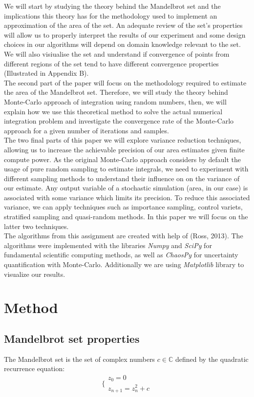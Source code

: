 \documentclass{article}
\begin{document}
    We will start by studying the theory behind the Mandelbrot set and the implications this theory has for the methodology used to implement an approximation of the area of the set. An adequate review of the set's properties will allow us to properly interpret the results of our experiment and some design choices in our algorithms will depend on domain knowledge relevant to the set. We will also visiualise the set and understand if convergence of points from different regions of the set tend to have different convergence properties (Illustrated in Appendix B).\\
    The second part of the paper will focus on the methodology required to estimate the area of the Mandelbrot set. Therefore, we will study the theory behind Monte-Carlo approach of integration using random numbers, then, we will explain how we use this theoretical method to solve the actual numerical integration problem and investigate the convergence rate of the Monte-Carlo approach for a given number of iterations and samples.\\
    The two final  parts of this paper we will explore variance reduction techniques, allowing us to increase the achievable precision of our area estimates given finite compute power. As the original Monte-Carlo approach considers by default the usage of pure random sampling to estimate integrals, we need to experiment with different sampling methods to understand their influence on on the variance of our estimate. Any output variable of a stochastic simulation (area, in our case) is associated with some variance which limits its precision. To reduce this associated variance, we can apply techniques such as importance sampling, control variets, stratified sampling and quasi-random methods. In this paper we will focus on the latter two techniques. \\
    The algorithms from this assignment are created with help of (Ross, 2013). The algorithms were implemented with the libraries \emph{Numpy} and \emph{SciPy} for fundamental scientific computing methods, as well as \emph{ChaosPy} for uncertainty quantification with Monte-Carlo. Additionally we are using \emph{Matplotlib} library to visualize our results.

    \newpage

    \section{Method}

    \subsection*{Mandelbrot set properties}
    \label{subsection:mandelbrot_theory}
    The Mandelbrot set is the set of complex numbers $c \in \mathbb{C}$ defined by the quadratic recurrence equation:
    \begin{equation*}
        \Bigg\{
        \begin{array}{l}
            z_0 = 0\\
            z_{n+1} = z_n^2 + c
        \end{array}
    \end{equation*}
\end{document}
